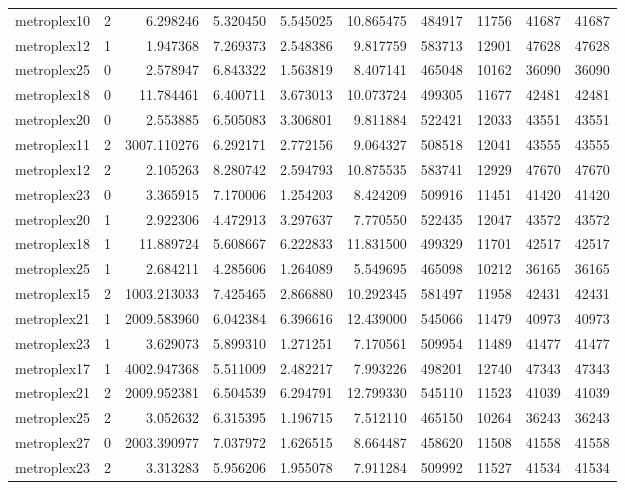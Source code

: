 \begin{longtable}{|l|r|r|r|r|r|r|r|r|r|}
metroplex10 & 2 & 6.298246 & 5.320450 & 5.545025 & 10.865475 & 484917 & 11756 & 41687 & 41687 \\
metroplex12 & 1 & 1.947368 & 7.269373 & 2.548386 & 9.817759 & 583713 & 12901 & 47628 & 47628 \\
metroplex25 & 0 & 2.578947 & 6.843322 & 1.563819 & 8.407141 & 465048 & 10162 & 36090 & 36090 \\
metroplex18 & 0 & 11.784461 & 6.400711 & 3.673013 & 10.073724 & 499305 & 11677 & 42481 & 42481 \\
metroplex20 & 0 & 2.553885 & 6.505083 & 3.306801 & 9.811884 & 522421 & 12033 & 43551 & 43551 \\
metroplex11 & 2 & 3007.110276 & 6.292171 & 2.772156 & 9.064327 & 508518 & 12041 & 43555 & 43555 \\
metroplex12 & 2 & 2.105263 & 8.280742 & 2.594793 & 10.875535 & 583741 & 12929 & 47670 & 47670 \\
metroplex23 & 0 & 3.365915 & 7.170006 & 1.254203 & 8.424209 & 509916 & 11451 & 41420 & 41420 \\
metroplex20 & 1 & 2.922306 & 4.472913 & 3.297637 & 7.770550 & 522435 & 12047 & 43572 & 43572 \\
metroplex18 & 1 & 11.889724 & 5.608667 & 6.222833 & 11.831500 & 499329 & 11701 & 42517 & 42517 \\
metroplex25 & 1 & 2.684211 & 4.285606 & 1.264089 & 5.549695 & 465098 & 10212 & 36165 & 36165 \\
metroplex15 & 2 & 1003.213033 & 7.425465 & 2.866880 & 10.292345 & 581497 & 11958 & 42431 & 42431 \\
metroplex21 & 1 & 2009.583960 & 6.042384 & 6.396616 & 12.439000 & 545066 & 11479 & 40973 & 40973 \\
metroplex23 & 1 & 3.629073 & 5.899310 & 1.271251 & 7.170561 & 509954 & 11489 & 41477 & 41477 \\
metroplex17 & 1 & 4002.947368 & 5.511009 & 2.482217 & 7.993226 & 498201 & 12740 & 47343 & 47343 \\
metroplex21 & 2 & 2009.952381 & 6.504539 & 6.294791 & 12.799330 & 545110 & 11523 & 41039 & 41039 \\
metroplex25 & 2 & 3.052632 & 6.315395 & 1.196715 & 7.512110 & 465150 & 10264 & 36243 & 36243 \\
metroplex27 & 0 & 2003.390977 & 7.037972 & 1.626515 & 8.664487 & 458620 & 11508 & 41558 & 41558 \\
metroplex23 & 2 & 3.313283 & 5.956206 & 1.955078 & 7.911284 & 509992 & 11527 & 41534 & 41534 \\

\end{longtable}
